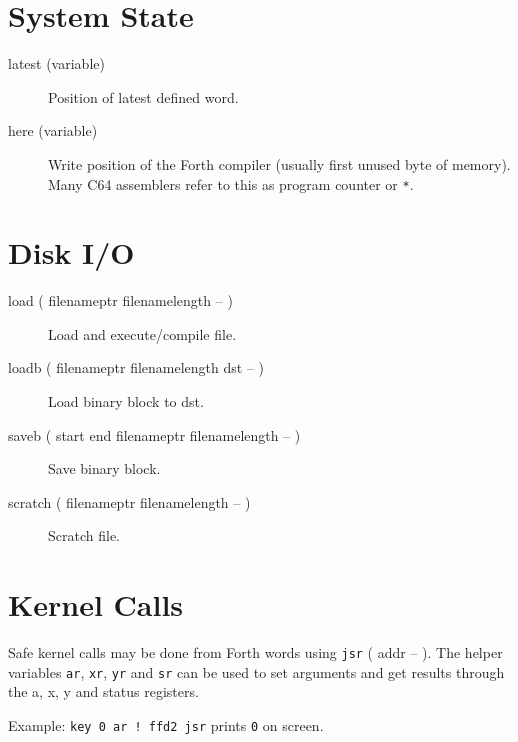 \section{System State}

\begin{description}

\item[latest (variable)] Position of latest defined word.

\item[here (variable)] Write position of the Forth compiler (usually first unused byte of memory). Many C64 assemblers refer to this as program counter or \texttt{*}.


\end{description}


\section{Disk I/O}

\begin{description}
\item[load ( filenameptr filenamelength -- )] Load and execute/compile file.
\item[loadb ( filenameptr filenamelength dst -- )] Load binary block to dst.
\item[saveb ( start end filenameptr filenamelength -- )] Save binary block.
\item[scratch ( filenameptr filenamelength -- )] Scratch file.
\end{description}

\section{Kernel Calls}

Safe kernel calls may be done from Forth words using \texttt{jsr} ( addr -- ). The helper variables \texttt{ar}, \texttt{xr}, \texttt{yr} and \texttt{sr} can be used to set arguments and get results through the a, x, y and status registers.

Example: \texttt{key 0 ar ! ffd2 jsr} prints \texttt{0} on screen.
